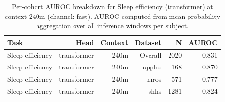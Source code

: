 \begin{table}[ht]
\centering
\caption{Per-cohort AUROC breakdown for Sleep efficiency (transformer) at context 240m (channel: fast). AUROC computed from mean-probability aggregation over all inference windows per subject.}
\label{tab:cohort_sleep_efficiency_binary_transformer_fast}
\begin{tabular}{lrrrrr}
\toprule
Task & Head & Context & Dataset & N & AUROC \\
\midrule
Sleep efficiency & transformer & 240m & Overall & 2020 & 0.831 \\
Sleep efficiency & transformer & 240m & apples & 168 & 0.870 \\
Sleep efficiency & transformer & 240m & mros & 571 & 0.777 \\
Sleep efficiency & transformer & 240m & shhs & 1281 & 0.824 \\
\bottomrule
\end{tabular}
\end{table}